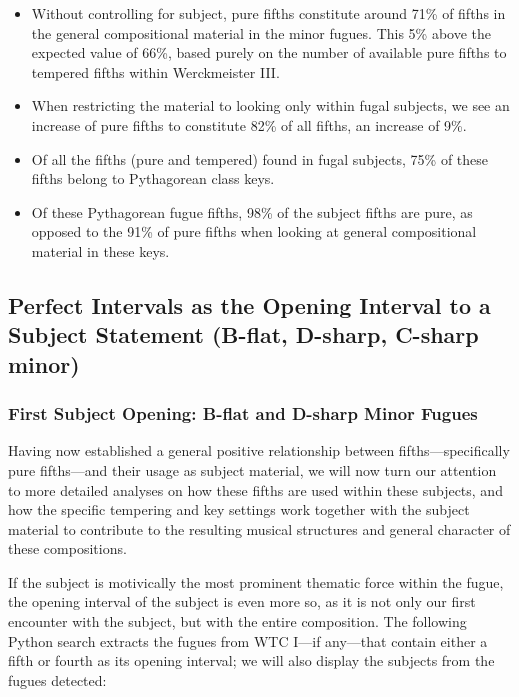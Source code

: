 \begin{itemize}
\tightlist
\item
  Without controlling for subject, pure fifths constitute around 71\% of
  fifths in the general compositional material in the minor fugues. This
  5\% above the expected value of 66\%, based purely on the number of
  available pure fifths to tempered fifths within Werckmeister III.
\item
  When restricting the material to looking only within fugal subjects,
  we see an increase of pure fifths to constitute 82\% of all fifths, an
  increase of 9\%.
\item
  Of all the fifths (pure and tempered) found in fugal subjects, 75\% of
  these fifths belong to Pythagorean class keys.
\item
  Of these Pythagorean fugue fifths, 98\% of the subject fifths are
  pure, as opposed to the 91\% of pure fifths when looking at general
  compositional material in these keys.
\end{itemize}

    \subsection{Perfect Intervals as the Opening Interval to a Subject
Statement (B-flat, D-sharp, C-sharp
minor)}\label{perfect-intervals-as-the-opening-interval-to-a-subject-statement-b-flat-d-sharp-c-sharp-minor}

\subsubsection{First Subject Opening: B-flat and D-sharp Minor
Fugues}\label{first-subject-opening-b-flat-and-d-sharp-minor-fugues}

Having now established a general positive relationship between
fifths---specifically pure fifths---and their usage as subject
material, we will now turn our attention to more detailed analyses on
how these fifths are used within these subjects, and how the specific
tempering and key settings work together with the subject material to
contribute to the resulting musical structures and general character of
these compositions.

If the subject is motivically the most prominent thematic force within
the fugue, the opening interval of the subject is even more so, as it is
not only our first encounter with the subject, but with the entire
composition. The following Python search extracts the fugues from WTC
I---if any---that contain either a fifth or fourth as its
opening interval; we will also display the subjects from the fugues
detected:

